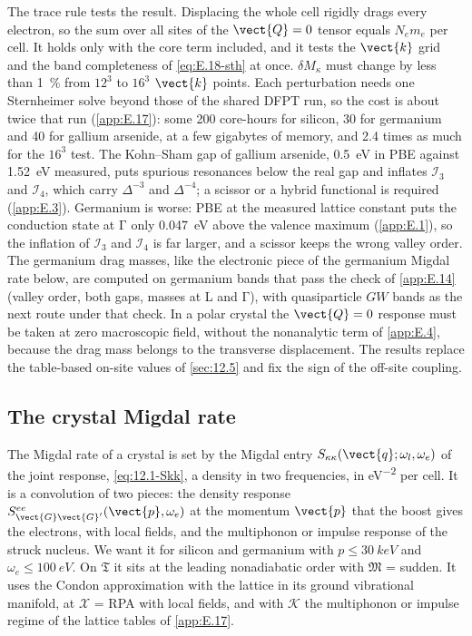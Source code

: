 The trace rule tests the result. Displacing the whole cell rigidly drags every electron, so the sum over all sites of the $\vect{Q} = 0$ tensor equals $N_e m_e$ per cell. It holds only with the core term included, and it tests the $\vect{k}$ grid and the band completeness of \cref{eq:E.18-sth} at once. $\delta M_\kappa$ must change by less than \SI{1}{\percent} from $12^3$ to $16^3$ $\vect{k}$ points. Each perturbation needs one Sternheimer solve beyond those of the shared DFPT run, so the cost is about twice that run (\cref{app:E.17}): some 200 core-hours for silicon, 30 for germanium and 40 for gallium arsenide, at a few gigabytes of memory, and 2.4 times as much for the $16^3$ test. The Kohn--Sham gap of gallium arsenide, \SI{0.5}{eV} in PBE against \SI{1.52}{eV} measured, puts spurious resonances below the real gap and inflates $\mathcal{I}_3$ and $\mathcal{I}_4$, which carry $\Delta^{-3}$ and $\Delta^{-4}$; a scissor or a hybrid functional is required (\cref{app:E.3}). Germanium is worse: PBE at the measured lattice constant puts the conduction state at $\mathrm{\Gamma}$ only \SI{0.047}{eV} above the valence maximum (\cref{app:E.1}), so the inflation of $\mathcal{I}_3$ and $\mathcal{I}_4$ is far larger, and a scissor keeps the wrong valley order. The germanium drag masses, like the electronic piece of the germanium Migdal rate below, are computed on germanium bands that pass the check of \cref{app:E.14} (valley order, both gaps, masses at L and $\mathrm{\Gamma}$), with quasiparticle $GW$ bands as the next route under that check. In a polar crystal the $\vect{Q} = 0$ response must be taken at zero macroscopic field, without the nonanalytic term of \cref{app:E.4}, because the drag mass belongs to the transverse displacement. The results replace the table-based on-site values of \cref{sec:12.5} and fix the sign of the off-site coupling.

\subsection{The crystal Migdal rate}

The Migdal rate of a crystal is set by the Migdal entry $S_{\kappa\kappa}(\vect{q};\omega_l,\omega_e)$ of the joint response, \cref{eq:12.1-Skk}, a density in two frequencies, in \si{eV^{-2}} per cell. It is a convolution of two pieces: the density response $S^{ee}_{\vect{G}\vect{G}'}(\vect{p},\omega_e)$ at the momentum $\vect{p}$ that the boost gives the electrons, with local fields, and the multiphonon or impulse response of the struck nucleus. We want it for silicon and germanium with $p \le \SI{30}{keV}$ and $\omega_e \le \SI{100}{eV}$. On $\mathfrak{T}$ it sits at the leading nonadiabatic order with $\mathfrak{M}$ = sudden. It uses the Condon approximation with the lattice in its ground vibrational manifold, at $\mathcal{X}$ = RPA with local fields, and with $\mathcal{K}$ the multiphonon or impulse regime of the lattice tables of \cref{app:E.17}.

